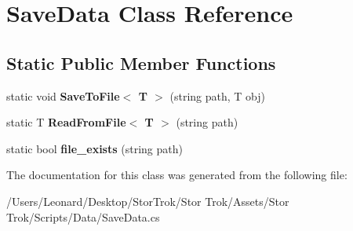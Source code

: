 \hypertarget{class_save_data}{}\section{Save\+Data Class Reference}
\label{class_save_data}
\subsection*{Static Public Member Functions}
\begin{DoxyCompactItemize}
\item 
\mbox{\label{class_save_data_a0a16b997b1530e161f0b83aad7b05236}} 
static void {\bfseries Save\+To\+File$<$ T $>$} (string path, T obj)
\item 
\mbox{\label{class_save_data_a183ce6a6a1789b279ab6bb912207affa}} 
static T {\bfseries Read\+From\+File$<$ T $>$} (string path)
\item 
\mbox{\label{class_save_data_afd6e90835a2057e1be90023764862a26}} 
static bool {\bfseries file\+\_\+exists} (string path)
\end{DoxyCompactItemize}


The documentation for this class was generated from the following file\+:\begin{DoxyCompactItemize}
\item 
/\+Users/\+Leonard/\+Desktop/\+Stor\+Trok/\+Stor Trok/\+Assets/\+Stor Trok/\+Scripts/\+Data/Save\+Data.\+cs\end{DoxyCompactItemize}
